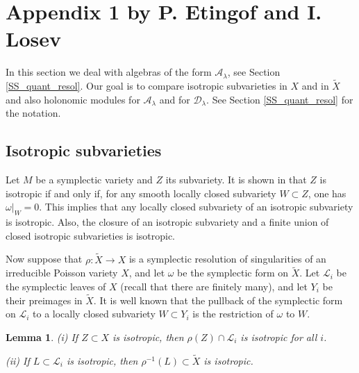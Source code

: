 \documentclass[12pt]{amsart}
\newcommand{\A}{\mathcal{A}}
\newtheorem{Lem}[Thm]{Lemma}
\theoremstyle{definition}
\begin{document}
\section{Appendix 1 by P. Etingof and I. Losev}\label{S_App}
In this section we deal with algebras of the form $\A_\lambda$, see Section \ref{SS_quant_resol}.
Our goal is to compare isotropic subvarieties in $X$ and in $\tilde{X}$ and also holonomic
modules for $\A_\lambda$ and for $\mathcal{D}_\lambda$. See Section \ref{SS_quant_resol} for the notation.
\subsection{Isotropic subvarieties}
Let $M$ be a symplectic variety and $Z$ its  subvariety.
It is shown in \cite[Prop. 1.3.30]{Chriss_Ginzburg} that $Z$ is isotropic if and only if, for any smooth locally closed subvariety $W\subset Z$, one has $\omega|_W=0$. This implies that any locally closed subvariety of an isotropic subvariety is isotropic. Also, the closure of an isotropic subvariety and a finite union of closed isotropic subvarieties is isotropic.

Now suppose that $\rho: \tilde{X}\rightarrow X$ is a symplectic resolution of singularities of an
irreducible Poisson variety $X$, and let $\omega$ be the symplectic form on $\tilde{X}$.
Let $\mathcal{L}_i$ be the symplectic leaves of $X$ (recall that there are finitely many), and let $Y_i$ be their preimages in $\tilde{X}$. It is well known that the pullback of the symplectic form on $\mathcal{L}_i$
to a locally closed subvariety $W\subset Y_i$ is the restriction of $\omega$ to $W$.

\begin{Lem}\label{Lem:isotr_resol} (i) If $Z\subset X$ is isotropic, then $\rho(Z)\cap \mathcal{L}_i$ is isotropic for all $i$.

(ii) If $L\subset \mathcal{L}_i$ is isotropic, then $\rho^{-1}(L)\subset \tilde{X}$ is isotropic.
\end{Lem}
\end{document}
